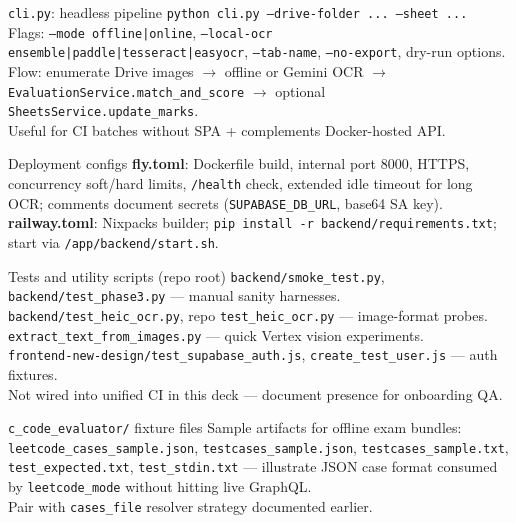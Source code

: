 \documentclass[aspectratio=169]{beamer}
\begin{document}
\begin{frame}{\texttt{cli.py}: headless pipeline}
  \tiny
  \texttt{python cli.py --drive-folder ... --sheet ...}\\
  Flags: \texttt{--mode offline|online}, \texttt{--local-ocr ensemble|paddle|tesseract|easyocr}, \texttt{--tab-name}, \texttt{--no-export}, dry-run options.\\
  Flow: enumerate Drive images $\rightarrow$ offline or Gemini OCR $\rightarrow$ \texttt{EvaluationService.match\_and\_score} $\rightarrow$ optional \texttt{SheetsService.update\_marks}.\\
  Useful for CI batches without SPA + complements Docker-hosted API.
\end{frame}

\begin{frame}{Deployment configs}
  \small
  \textbf{fly.toml}: Dockerfile build, internal port 8000, HTTPS, concurrency soft/hard limits, \texttt{/health} check, extended idle timeout for long OCR; comments document secrets (\texttt{SUPABASE\_DB\_URL}, base64 SA key).\\
  \textbf{railway.toml}: Nixpacks builder; \texttt{pip install -r backend/requirements.txt}; start via \texttt{/app/backend/start.sh}.
\end{frame}

\begin{frame}{Tests and utility scripts (repo root)}
  \tiny
  \texttt{backend/smoke\_test.py}, \texttt{backend/test\_phase3.py} --- manual sanity harnesses.\\
  \texttt{backend/test\_heic\_ocr.py}, repo \texttt{test\_heic\_ocr.py} --- image-format probes.\\
  \texttt{extract\_text\_from\_images.py} --- quick Vertex vision experiments.\\
  \texttt{frontend-new-design/test\_supabase\_auth.js}, \texttt{create\_test\_user.js} --- auth fixtures.\\
  Not wired into unified CI in this deck --- document presence for onboarding QA.
\end{frame}

\begin{frame}{\texttt{c\_code\_evaluator/} fixture files}
  \small
  Sample artifacts for offline exam bundles:\\
  \texttt{leetcode\_cases\_sample.json}, \texttt{testcases\_sample.json}, \texttt{testcases\_sample.txt}, \texttt{test\_expected.txt}, \texttt{test\_stdin.txt} --- illustrate JSON case format consumed by \texttt{leetcode\_mode} without hitting live GraphQL.\\
  Pair with \texttt{cases\_file} resolver strategy documented earlier.
\end{frame}
\end{document}
